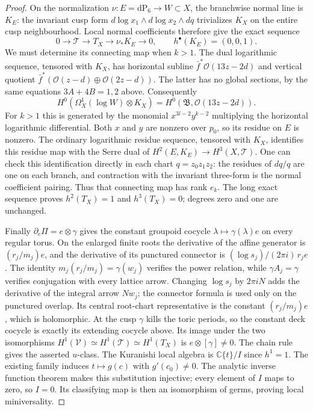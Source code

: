 \begin{proof}
On the normalization $\nu:E=\mathrm{dP}_6\to W\subset X$,
the branchwise normal line is $K_E$: the invariant cusp form
$d\log x_1\wedge d\log x_2\wedge dq$ trivializes $K_X$
on the entire cusp neighbourhood.  Local normal coefficients
therefore give the exact sequence
\[
 0\longrightarrow\mathcal T\longrightarrow T_X
 \longrightarrow\nu_*K_E\longrightarrow0,
 \qquad h^\bullet(K_E)=(0,0,1).
\]
We must determine its connecting map when $k>1$.
The dual logarithmic sequence, tensored with $K_X$, has horizontal
subline $\bar f^*\mathcal O(13z-2d)$ and vertical quotient
$\bar f^*(\mathcal O(z-d)\oplus\mathcal O(2z-d))$.
The latter has no global sections, by the same equations
$3A+4B=1,2$ above.  Consequently
\[
 H^0(\Omega_X^1(\log W)\otimes K_X)
 =H^0(\mathfrak B,\mathcal O(13z-2d)).
\]
For $k>1$ this is generated by the monomial
$x^{3l-2}y^{k-2}$ multiplying the horizontal logarithmic
differential.  Both $x$ and $y$ are nonzero over $p_0$, so its
residue on $E$ is nonzero.  The ordinary logarithmic residue
sequence, tensored with $K_X$, identifies this residue map with
the Serre dual of
$H^2(E,K_E)\to H^3(X,\mathcal T)$.
One can check this identification directly in each chart
$q=z_0z_1z_2$: the residues of $dq/q$ are one on each branch,
and contraction with the invariant three-form is the normal
coefficient pairing.  Thus that connecting map has rank $e_k$.
The long exact sequence proves $h^2(T_X)=1$ and $h^3(T_X)=0$;
degrees zero and one are unchanged.

Finally $\partial_c\Pi=e\otimes\gamma$ gives the constant
groupoid cocycle $\lambda\mapsto\gamma(\lambda)e$ on every
regular torus.  On the enlarged finite roots the derivative of the
affine generator is $(r_j/m_j)e$, and the derivative of its
punctured connector is $(\log s_j)/(2\pi i)\,r_je$.
The identity $m_j(r_j/m_j)=\gamma(w_j)$ verifies the power
relation, while $\gamma A_j=\gamma$ verifies conjugation with
every lattice arrow.  Changing $\log s_j$ by $2\pi i N$
adds the derivative of the integral arrow $Nw_j$; the connector
formula is used only on the punctured overlap.  Its central
root-chart representative is the constant $(r_j/m_j)e$,
which is holomorphic.  At the cusp $\gamma$ kills the toric periods,
so the constant deck cocycle is exactly its extending cocycle
above.  Its image under the two isomorphisms
$H^1(\mathcal V)\simeq H^1(\mathcal T)\simeq H^1(T_X)$
is $e\otimes[\gamma]\ne0$.  The chain rule gives the asserted
$u$-class.  The Kuranishi local algebra is
$\mathbb C\{t\}/I$ since $h^1=1$.  The existing family induces
$t\mapsto g(c)$ with $g'(c_0)\ne0$.  The analytic inverse
function theorem makes this substitution injective; every
element of $I$ maps to zero, so $I=0$.  Its classifying map is
then an isomorphism of germs, proving local miniversality.
\end{proof}


